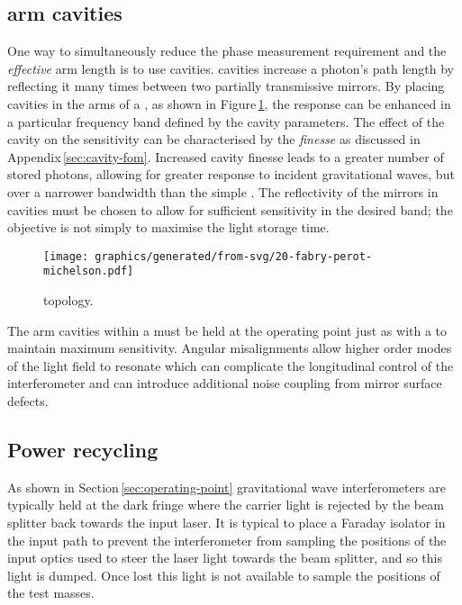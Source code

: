\subsection{\label{sec:fabry-perot-cavities}\FP{} arm cavities}
One way to simultaneously reduce the phase measurement requirement and the \emph{effective} arm length is to use \FP{} cavities. \FP{} cavities increase a photon's path length by reflecting it many times between two partially transmissive mirrors. By placing \FP{} cavities in the arms of a \MI{}, as shown in Figure\,\ref{fig:fpmi}, the response can be enhanced in a particular frequency band defined by the cavity parameters. The effect of the cavity on the sensitivity can be characterised by the \emph{finesse} as discussed in Appendix\,\ref{sec:cavity-fom}. Increased cavity finesse leads to a greater number of stored photons, allowing for greater response to incident gravitational waves, but over a narrower bandwidth than the simple \MI{}. The reflectivity of the mirrors in \FP{} cavities must be chosen to allow for sufficient sensitivity in the desired band; the objective is not simply to maximise the light storage time.

\begin{figure}
  \centering
  \texttt{[image: graphics/generated/from-svg/20-fabry-perot-michelson.pdf]}
  \caption[\FPMI{}]{\label{fig:fpmi}\FPMI{} topology.}
\end{figure}

The arm cavities within a \FPMI{} must be held at the operating point just as with a \MI{} to maintain maximum sensitivity. Angular misalignments allow higher order modes of the light field to resonate which can complicate the longitudinal control of the interferometer and can introduce additional noise coupling from mirror surface defects.

\subsection{\label{sec:power-recycling}Power recycling}
As shown in Section\,\ref{sec:operating-point} gravitational wave interferometers are typically held at the dark fringe where the carrier light is rejected by the beam splitter back towards the input laser. It is typical to place a Faraday isolator in the input path to prevent the interferometer from sampling the positions of the input optics used to steer the laser light towards the beam splitter, and so this light is dumped. Once lost this light is not available to sample the positions of the test masses.

